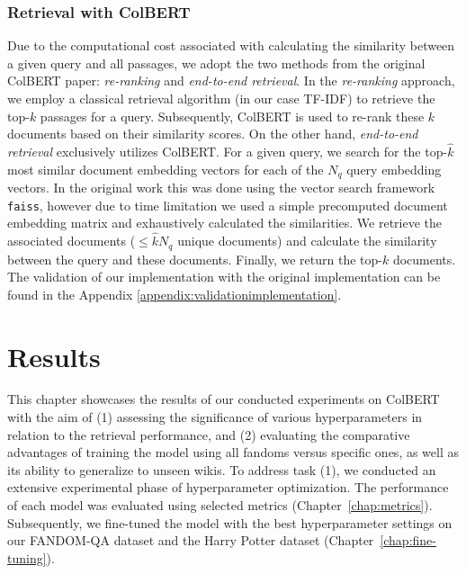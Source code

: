 \documentclass[11pt]{article}
\begin{document}
\subsubsection{Retrieval with ColBERT} \label{chap:retrieval}
Due to the computational cost associated with calculating the similarity between a given query and all passages, we adopt the two methods from the original ColBERT paper: \textit{re-ranking} and \textit{end-to-end retrieval}. In the \textit{re-ranking} approach, we employ a classical retrieval algorithm (in our case TF-IDF) to retrieve the top-$k$ passages for a query. Subsequently, ColBERT is used to re-rank these $k$ documents based on their similarity scores. On the other hand, \textit{end-to-end retrieval} exclusively utilizes ColBERT. For a given query, we search for the top-$\hat{k}$ most similar document embedding vectors for each of the $N_q$ query embedding vectors. In the original work this was done using the vector search framework \texttt{faiss}, however due to time limitation we used a simple precomputed document embedding matrix and exhaustively calculated the similarities. We retrieve the associated documents ($\leq \hat{k}N_q$ unique documents) and calculate the similarity between the query and these documents. Finally, we return the top-$k$ documents. 
The validation of our implementation with the original implementation can be found in the Appendix \ref{appendix:validationimplementation}.

\section{Results}
\label{chap:results}
This chapter showcases the results of our conducted experiments on ColBERT with the aim of
(1) assessing the significance of various hyperparameters in relation to the retrieval performance, and
(2) evaluating the comparative advantages of training the model using all fandoms versus specific ones, as well as its ability to generalize to unseen wikis.
To address task (1), we conducted an extensive experimental phase of hyperparameter optimization. %
The performance of each model was evaluated using selected metrics (Chapter~\ref{chap:metrics}). 
Subsequently, we fine-tuned the model with the best hyperparameter settings on our FANDOM-QA dataset and the Harry Potter dataset  (Chapter~\ref{chap:fine-tuning}).
\end{document}
